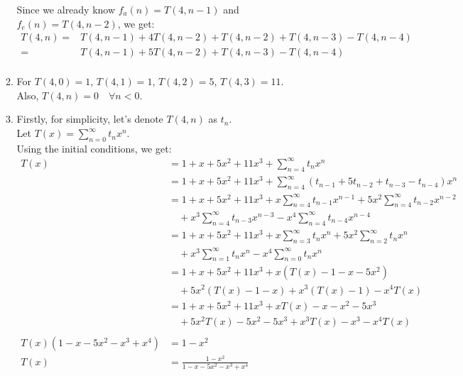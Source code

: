 \documentclass[a4paper]{article}
\begin{document}
\begin{enumerate}
\begin{enumerate}
            Since we already know $f_a(n) = T(4, n-1)$ and $f_e(n) = T(4, n-2)$, we get:
            \[
                \begin{split}
                    T(4, n) =& T(4, n-1) + 4T(4, n-2) + T(4, n-2) + T(4, n - 3) - T(4, n-4) \\
                    =& T(4, n-1) + 5T(4, n-2) + T(4, n - 3) - T(4, n-4) \\
                \end{split}
            \]
            
            \item For $T(4, 0) = 1$, $T(4, 1) = 1$, $T(4, 2) = 5$, $T(4, 3) = 11$. \\
            Also, $T(4, n) = 0 \quad \forall n < 0$. \\

            \newpage
            \item Firstly, for simplicity, let's denote $T(4, n)$ as $t_n$. \\

            Let $T(x) = \sum_{n=0}^{\infty} t_nx^n$. \\

            Using the initial conditions, we get:
            \[
                \begin{split}
                    T(x) &= 1 + x + 5x^2 + 11x^3 + \sum_{n=4}^{\infty} t_nx^n \\
                    &=  1 + x + 5x^2 + 11x^3 + \sum_{n=4}^{\infty} (t_{n-1} + 5t_{n-2} + t_{n-3} - t_{n-4})x^n \\
                    &=  1 + x + 5x^2 + 11x^3 + x\sum_{n=4}^{\infty} t_{n-1}x^{n-1} + 5x^2\sum_{n=4}^{\infty} t_{n-2}x^{n-2} \\
                    & \quad + x^3\sum_{n=4}^{\infty} t_{n-3}x^{n-3} - x^4\sum_{n=4}^{\infty} t_{n-4}x^{n-4} \\
                    &=  1 + x + 5x^2 + 11x^3 + x\sum_{n=3}^{\infty} t_{n}x^{n} + 5x^2\sum_{n=2}^{\infty} t_{n}x^{n} \\
                    & \quad + x^3\sum_{n=1}^{\infty} t_{n}x^{n} - x^4\sum_{n=0}^{\infty} t_{n}x^{n} \\
                    &=  1 + x + 5x^2 + 11x^3 + x(T(x) - 1 - x - 5x^2) \\
                    & \quad + 5x^2(T(x) - 1 - x) + x^3(T(x) - 1) - x^4T(x) \\
                    &=  1 + x + 5x^2 + 11x^3 + xT(x) - x - x^2 - 5x^3 \\
                    & \quad + 5x^2T(x) - 5x^2 - 5x^3 + x^3T(x) - x^3 - x^4T(x) \\ \\
                    T(x)(1 - x - 5x^2 - x^3 + x^4) &= 1 - x^2 \\
                    T(x) &= \frac{1 - x^2}{1 - x - 5x^2 - x^3 + x^4} \\
                \end{split}
            \]\\
            

\end{enumerate}
\end{enumerate}
\end{document}
